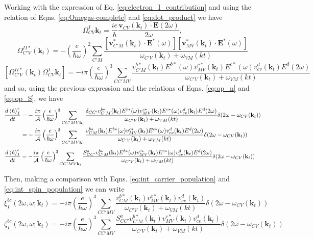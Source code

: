 \documentclass{article}
\newcommand{\kt}{\mathbf{k}_{t}}
\newcommand{\dw}{\delta(2\omega - \omega_{CV}(\kt))}
\begin{document}
Working with the expression of Eq. \eqref{eq:electron_I_contribution} and using
the relation of Eqns. \eqref{eq:Omegas-complete} and  \eqref{eq:dot_product} we
have
\begin{equation*}
\Omega^{I}_{CV}{\kt} = \frac{ie}{\hbar}
\frac{\mathbf{v}_{CV}(\kt) \cdot \mathbf{E}(2\omega)}{2\omega} ,
\end{equation*}
\begin{equation*}
\Omega^{II*}_{C'V}(\kt) = - \left(\frac{e}{\hbar\omega}\right)^{2}
\sum_{C'M} \frac{[\mathbf{v}^{*}_{C'M}(\kt) \cdot \mathbf{E}^{*}(\omega)]
[\mathbf{v}^{*}_{MV}(\kt)\cdot\mathbf{E}^{*}(\omega)]}{\omega_{C'V}(\kt)+\omega_{VM}(kt)}
\end{equation*}
\begin{equation}\label{eq:omegaII*CpV_omegaICV_product}
[\Omega^{II*}_{C'V}(\kt) \Omega^{I}_{CV}{\kt}] =  -i \pi \left( \frac{e}{\hbar\omega} 
\right)^{3} \sum_{CC'MV} \frac{v^{b*}_{C'M}(\kt) E^{b*}(\omega)
v^{c*}_{MV}(\kt) E^{c*}(\omega) v^{d}_{cv}(\kt) E^{d}(2\omega) }
{\omega_{C'V}(\kt)+\omega_{VM}(kt)}
\end{equation}
and so, using the previous expression and the relations of Eqns. \eqref{eq:op_n} and
\eqref{eq:op_S}, we have 
\begin{equation}
\begin{split}
\frac{d\ev*{\hat{n}}^{e}_{I}}{dt} =&
- \frac{i \pi}{\mathcal{A}} \left( \frac{e}{\hbar\omega} 
\right)^{3} \sum_{CC'MV\kt} \frac{\delta_{CC'}v^{b*}_{C'M}(\kt) E^{b*}(\omega)
v^{c*}_{MV}(\kt) E^{c*}(\omega) v^{d}_{cv}(\kt) E^{d}(2\omega) }
{\omega_{C'V}(\kt)+\omega_{VM}(kt)} \dw \\
=& - \frac{i \pi}{\mathcal{A}} \left( \frac{e}{\hbar\omega} 
\right)^{3} \sum_{CC'MV\kt} \frac{v^{b*}_{CM}(\kt) E^{b*}(\omega)
v^{c*}_{MV}(\kt) E^{c*}(\omega) v^{d}_{cv}(\kt) E^{d}(2\omega) }
{\omega_{C'V}(\kt)+\omega_{VM}(kt)} \dw
\end{split}
\end{equation}
\begin{equation}
\begin{split}
\frac{d\ev*{\hat{n}}^{e}_{I}}{dt} &=
- \frac{i \pi}{\mathcal{A}} \left( \frac{e}{\hbar\omega} 
\right)^{3} \sum_{CC'MV\kt} \frac{S^{a}_{CC'}v^{b*}_{C'M}(\kt) E^{b*}(\omega)
v^{c*}_{MV}(\kt) E^{c*}(\omega) v^{d}_{cv}(\kt) E^{d}(2\omega) }
{\omega_{C'V}(\kt)+\omega_{VM}(kt)} \dw
\end{split}
\end{equation}

Then, making a comparison with Eqns. \eqref{eq:int_carrier_population} and 
\eqref{eq:int_spin_population} we can write 
\begin{equation*}
\xi^{bc}_{I}(2\omega,\omega;\kt) =  - i \pi \left( \frac{e}{\hbar\omega} 
\right)^{3} \sum_{CC'MV} \frac{v^{b*}_{CM}(\kt)
v^{c*}_{MV}(\kt) v^{d}_{cv}(\kt) }
{\omega_{C'V}(\kt)+\omega_{VM}(kt)} \dw
\end{equation*}
\begin{equation*}
\zeta^{bc}_{I}(2\omega,\omega;\kt) = - i \pi \left( \frac{e}{\hbar\omega} 
\right)^{3} \sum_{CC'MV} \frac{S^{a}_{CC'}v^{b*}_{C'M}(\kt)
v^{c*}_{MV}(\kt) v^{d}_{cv}(\kt) }
{\omega_{C'V}(\kt)+\omega_{VM}(kt)} \dw
\end{equation*}
\end{document}
